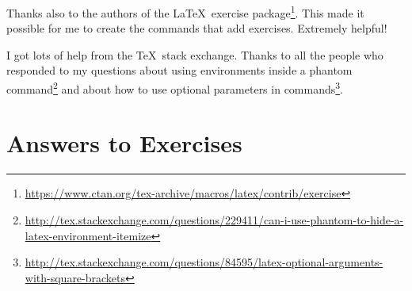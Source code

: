 \documentclass{article}
\begin{document}
Thanks also to the authors of the \LaTeX\ exercise package\footnote{\url{https://www.ctan.org/tex-archive/macros/latex/contrib/exercise}}.  This made it possible for me to create the commands that add exercises.  Extremely helpful!

I got lots of help from the \TeX\ stack exchange.  Thanks to all the people who responded to my questions about using environments inside  a phantom command\footnote{\url{http://tex.stackexchange.com/questions/229411/can-i-use-phantom-to-hide-a-latex-environment-itemize}} and about how to use optional parameters in commands\footnote{\url{http://tex.stackexchange.com/questions/84595/latex-optional-arguments-with-square-brackets}}.


\appendix

\section{Answers to Exercises}

\shipoutAnswer
\end{document}
